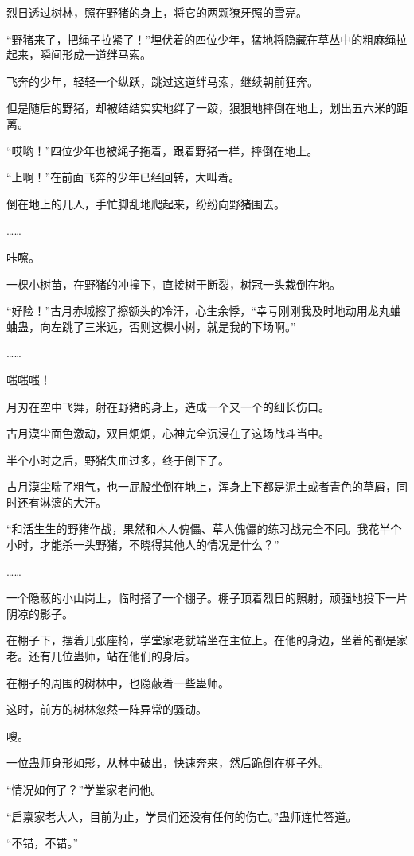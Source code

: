 \begin{this_body}
烈日透过树林，照在野猪的身上，将它的两颗獠牙照的雪亮。

“野猪来了，把绳子拉紧了！”埋伏着的四位少年，猛地将隐藏在草丛中的粗麻绳拉起来，瞬间形成一道绊马索。

飞奔的少年，轻轻一个纵跃，跳过这道绊马索，继续朝前狂奔。

但是随后的野猪，却被结结实实地绊了一跤，狠狠地摔倒在地上，划出五六米的距离。

“哎哟！”四位少年也被绳子拖着，跟着野猪一样，摔倒在地上。

“上啊！”在前面飞奔的少年已经回转，大叫着。

倒在地上的几人，手忙脚乱地爬起来，纷纷向野猪围去。

……

咔嚓。

一棵小树苗，在野猪的冲撞下，直接树干断裂，树冠一头栽倒在地。

“好险！”古月赤城擦了擦额头的冷汗，心生余悸，“幸亏刚刚我及时地动用龙丸蛐蛐蛊，向左跳了三米远，否则这棵小树，就是我的下场啊。”

……

嗤嗤嗤！

月刃在空中飞舞，射在野猪的身上，造成一个又一个的细长伤口。

古月漠尘面色激动，双目炯炯，心神完全沉浸在了这场战斗当中。

半个小时之后，野猪失血过多，终于倒下了。

古月漠尘喘了粗气，也一屁股坐倒在地上，浑身上下都是泥土或者青色的草屑，同时还有淋漓的大汗。

“和活生生的野猪作战，果然和木人傀儡、草人傀儡的练习战完全不同。我花半个小时，才能杀一头野猪，不晓得其他人的情况是什么？”

……

一个隐蔽的小山岗上，临时搭了一个棚子。棚子顶着烈日的照射，顽强地投下一片阴凉的影子。

在棚子下，摆着几张座椅，学堂家老就端坐在主位上。在他的身边，坐着的都是家老。还有几位蛊师，站在他们的身后。

在棚子的周围的树林中，也隐蔽着一些蛊师。

这时，前方的树林忽然一阵异常的骚动。

嗖。

一位蛊师身形如影，从林中破出，快速奔来，然后跪倒在棚子外。

“情况如何了？”学堂家老问他。

“启禀家老大人，目前为止，学员们还没有任何的伤亡。”蛊师连忙答道。

“不错，不错。”


\end{this_body}
